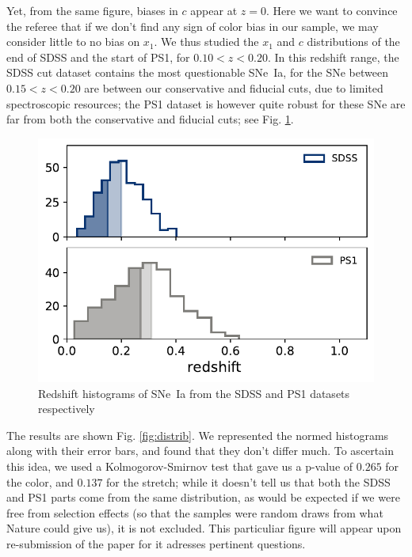 \documentclass[11pt,a4paper]{paper}
\begin{document}
Yet, from the same figure, biases in $c$ appear at $z=0$. Here we want to
convince the referee that if we don't find any sign of color bias in our sample,
we may consider little to no bias on $x_1$. We thus studied the $x_1$ and $c$
distributions of the end of SDSS and the start of PS1, for $0.10 < z < 0.20$. In
this redshift range, the SDSS cut dataset contains the most questionable SNe~Ia,
for the SNe between $0.15 < z < 0.20$ are between our conservative and fiducial
cuts, due to limited spectroscopic resources; the PS1 dataset is however quite
robust for these SNe are far from both the conservative and fiducial cuts; see
Fig. \ref{fig:hists}. \bigbreak

\begin{figure}
    \vspace*{-28pt}
    \centering
    \includegraphics[width=\linewidth]{Answer_figures/hist_surveys2_btw_cividis.pdf}
    \captionsetup{justification=centering, size=scriptsize}
    \caption{Redshift histograms of SNe~Ia from the SDSS and PS1 datasets
    respectively}
    \label{fig:hists}
\end{figure}

The results are shown Fig. \ref{fig:distrib}. We represented the normed
histograms along with their error bars, and found that they don't differ much.
To ascertain this idea, we used a Kolmogorov-Smirnov test that gave us a p-value
of $0.265$ for the color, and $0.137$ for the stretch; while it doesn't tell us
that both the SDSS and PS1 parts come from the same distribution, as would be
expected if we were free from selection effects (so that the samples were random
draws from what Nature could give us), it is not excluded. This particuliar
figure will appear upon re-submission of the paper for it adresses pertinent
questions.
\end{document}
